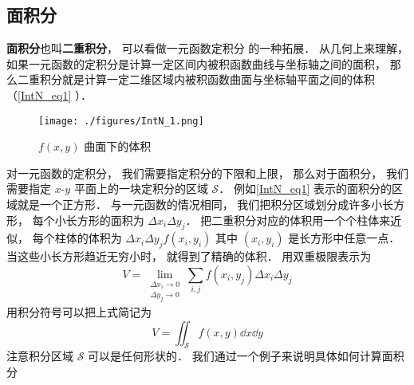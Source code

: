 
\begin{issues}
\issueTODO
\end{issues}

\subsection{面积分}
\textbf{面积分}也叫\textbf{二重积分}， 可以看做一元函数定积分 的一种拓展． 从几何上来理解， 如果一元函数的定积分是计算一定区间内被积函数曲线与坐标轴之间的面积， 那么二重积分就是计算一定二维区域内被积函数曲面与坐标轴平面之间的体积（\autoref{IntN_eq1} ）．

\begin{figure}[ht]
\centering
\texttt{[image: ./figures/IntN\_1.png]}
\caption{$f(x, y)$ 曲面下的体积} \label{IntN_fig1}
\end{figure}

对一元函数的定积分， 我们需要指定积分的下限和上限， 那么对于面积分， 我们需要指定 $x$-$y$ 平面上的一块定积分的区域 $\mathcal S$． 例如\autoref{IntN_eq1} 表示的面积分的区域就是一个正方形． 与一元函数的情况相同， 我们把积分区域划分成许多小长方形， 每个小长方形的面积为 $\Delta x_i \Delta y_j$． 把二重积分对应的体积用一个个柱体来近似， 每个柱体的体积为 $\Delta x_i \Delta y_j f(x_i, y_i)$ 其中 $(x_i, y_i)$ 是长方形中任意一点． 当这些小长方形趋近无穷小时， 就得到了精确的体积． 用双重极限表示为 %
\begin{equation}\label{IntN_eq1}
V = \lim_{\substack{\Delta x_i\to 0\\ \Delta y_j\to 0}} \sum_{i, j} f(x_i,y_j) \Delta x_i \Delta y_j
\end{equation}
用积分符号可以把上式简记为
\begin{equation}
V = \iint_{\mathcal{S}} f(x,y) \dd{x}\dd{y}
\end{equation}
注意积分区域 $\mathcal S$ 可以是任何形状的． 我们通过一个例子来说明具体如何计算面积分

